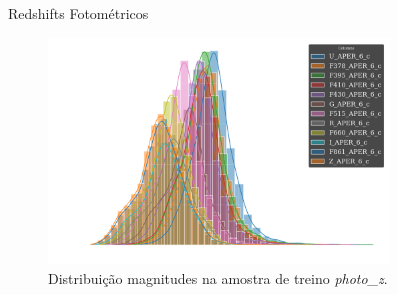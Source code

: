 \begin{frame}[c]{Redshifts Fotométricos}
    \vspace{0.5cm}
    \begin{figure}
        \centering
        \includegraphics[width=0.8\linewidth, height=6cm, keepaspectratio]{images/overlaid_histogram_mags_aper_6_c.png}
        \caption{Distribuição magnitudes na amostra de treino \textit{photo\_z}.}
    \end{figure}
\end{frame}

